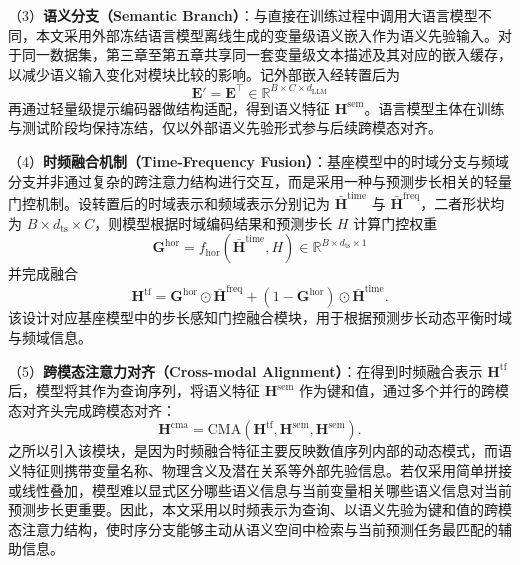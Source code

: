 （3）\textbf{语义分支（Semantic Branch）}：与直接在训练过程中调用大语言模型不同，本文采用外部冻结语言模型离线生成的变量级语义嵌入作为语义先验输入。对于同一数据集，第三章至第五章共享同一套变量级文本描述及其对应的嵌入缓存，以减少语义输入变化对模块比较的影响。记外部嵌入经转置后为
\begin{equation}
\mathbf{E}' = \mathbf{E}^{\top} \in \mathbb{R}^{B\times C\times d_{\text{LLM}}}
\label{eq:chap3-semantic-embedding}
\end{equation}
再通过轻量级提示编码器做结构适配，得到语义特征 $\mathbf{H}^{\text{sem}}$。语言模型主体在训练与测试阶段均保持冻结，仅以外部语义先验形式参与后续跨模态对齐。

（4）\textbf{时频融合机制（Time-Frequency Fusion）}：基座模型中的时域分支与频域分支并非通过复杂的跨注意力结构进行交互，而是采用一种与预测步长相关的轻量门控机制。设转置后的时域表示和频域表示分别记为 $\bar{\mathbf{H}}^{\text{time}}$ 与 $\bar{\mathbf{H}}^{\text{freq}}$，二者形状均为 $B\times d_{\text{ts}}\times C$，则模型根据时域编码结果和预测步长 $H$ 计算门控权重
\begin{equation}
\mathbf{G}^{\text{hor}} = f_{\text{hor}}(\bar{\mathbf{H}}^{\text{time}}, H)\in\mathbb{R}^{B\times d_{\text{ts}}\times 1}
\label{eq:chap3-horizon-gate}
\end{equation}
并完成融合
\begin{equation}
\mathbf{H}^{\text{tf}} = \mathbf{G}^{\text{hor}} \odot \bar{\mathbf{H}}^{\text{freq}} + (1-\mathbf{G}^{\text{hor}})\odot \bar{\mathbf{H}}^{\text{time}}.
\label{eq:chap3-time-freq-fusion}
\end{equation}
该设计对应基座模型中的步长感知门控融合模块，用于根据预测步长动态平衡时域与频域信息。

（5）\textbf{跨模态注意力对齐（Cross-modal Alignment）}：在得到时频融合表示 $\mathbf{H}^{\text{tf}}$ 后，模型将其作为查询序列，将语义特征 $\mathbf{H}^{\text{sem}}$ 作为键和值，通过多个并行的跨模态对齐头完成跨模态对齐：
\begin{equation}
\mathbf{H}^{\text{cma}} = \mathrm{CMA}(\mathbf{H}^{\text{tf}}, \mathbf{H}^{\text{sem}}, \mathbf{H}^{\text{sem}}).
\label{eq:chap3-cma}
\end{equation}
之所以引入该模块，是因为时频融合特征主要反映数值序列内部的动态模式，而语义特征则携带变量名称、物理含义及潜在关系等外部先验信息。若仅采用简单拼接或线性叠加，模型难以显式区分哪些语义信息与当前变量相关哪些语义信息对当前预测步长更重要。因此，本文采用以时频表示为查询、以语义先验为键和值的跨模态注意力结构，使时序分支能够主动从语义空间中检索与当前预测任务最匹配的辅助信息。

